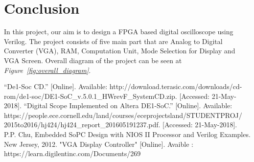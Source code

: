 \documentclass[paper]{IEEEtran}
\begin{document}
	
	
\section{Conclusion}
\- \indent
	In this project, our aim is to design a FPGA based digital oscilloscope using Verilog. The project consists of five main part that are Analog to Digital Converter (VGA), RAM, Computation Unit, Mode Selection for Display and VGA Screen. Overall diagram of the project can be seen at \textit{Figure~\ref{fig:overall_diagram}}. 
	
	

\begin{thebibliography}{00}
 “De1-Soc CD.” [Online]. Available: http://download.terasic.com/downloads/cd-rom/de1-soc/DE1-SoC\_v.5.0.1\_HWrevF\_SystemCD.zip. [Accessed: 21-May-2018].
 “Digital Scope Implemented on Altera DE1-SoC.” [Online]. Available: https://people.ece.cornell.edu/land/courses/eceprojectsland/STUDENTPROJ/\\2015to2016/hj424/hj424\_report\_201605191237.pdf. [Accessed: 21-May-2018].
 P.P. Chu, Embedded SoPC Design with NIOS II Processor and Verilog Examples. New Jersey, 2012.
 "VGA Display Controller" [Online]. Avaible : https://learn.digilentinc.com/Documents/269
\end{thebibliography}
\end{document}
